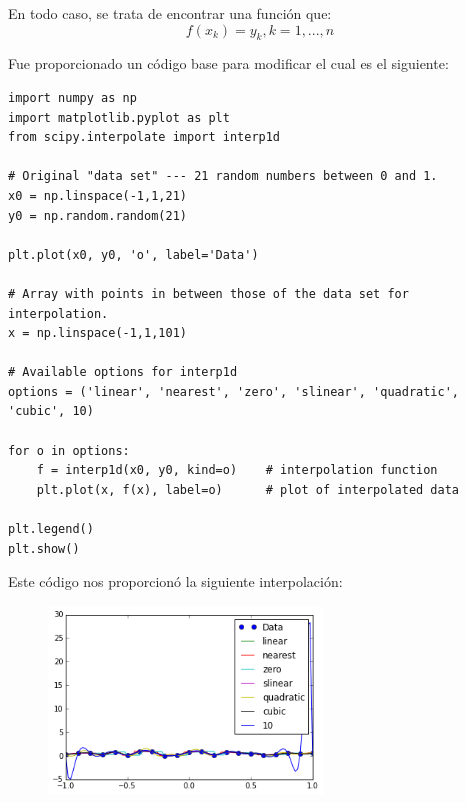 \documentclass[12pt]{article}
\begin{document}
En todo caso, se trata de encontrar una función que:
\begin{equation}
f(x_k)=y_k, k=1,...,n
\end{equation}
  
  Fue proporcionado un código base para modificar el cual es el siguiente: 
  
  
  \begin{verbatim}
import numpy as np
import matplotlib.pyplot as plt
from scipy.interpolate import interp1d

# Original "data set" --- 21 random numbers between 0 and 1.
x0 = np.linspace(-1,1,21)
y0 = np.random.random(21)

plt.plot(x0, y0, 'o', label='Data')

# Array with points in between those of the data set for interpolation.
x = np.linspace(-1,1,101)

# Available options for interp1d
options = ('linear', 'nearest', 'zero', 'slinear', 'quadratic', 'cubic', 10)

for o in options:
    f = interp1d(x0, y0, kind=o)    # interpolation function
    plt.plot(x, f(x), label=o)      # plot of interpolated data

plt.legend()
plt.show()
\end{verbatim}
 Este código nos proporcionó la siguiente interpolación:
 \begin{figure}[H]
\centering
\includegraphics[height=5cm]{index.png}
\end{figure}
\end{document}
